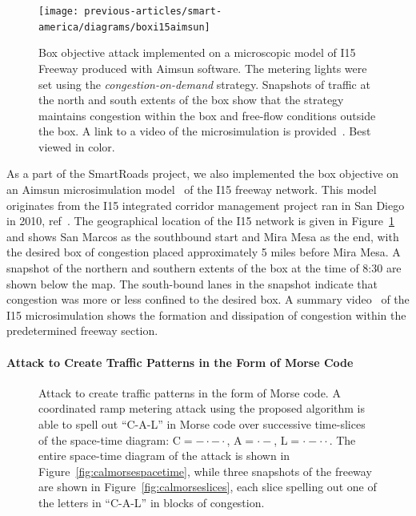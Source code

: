 \begin{figure}
	\centering
	\texttt{[image: previous-articles/smart-america/diagrams/boxi15aimsun]}
	\caption[Box objective attack implemented on a microscopic model of I15 Freeway produced with Aimsun software.]{Box objective attack implemented on a microscopic model of I15 Freeway produced with Aimsun software.  The metering lights were set using the \emph{congestion-on-demand} strategy. Snapshots of traffic at the north and south extents of the box show that the strategy maintains congestion within the box and free-flow conditions outside the box. A link to a video of the microsimulation is provided~\cite{smartroadswebsite}. Best viewed in color.}
	\label{fig:boxi15aimsun}
\end{figure}

As a part of the SmartRoads project, we also implemented the box objective on an Aimsun microsimulation model~\cite{barcelo2001microscopic} of the I15 freeway network. This model originates from the I15 integrated corridor management project ran in San Diego in 2010, ref~\cite{miller2010san}. The geographical location of the I15 network is given in Figure~\ref{fig:boxi15aimsun} and shows San Marcos as the southbound start and Mira Mesa as the end, with the desired box of congestion placed approximately 5 miles before Mira Mesa. A snapshot of the northern and southern extents of the box at the time of 8:30 are shown below the map. The south-bound lanes in the snapshot indicate that congestion was more or less confined to the desired box. A summary video~\cite{smartroadswebsite} of the I15 microsimulation shows the formation and dissipation of congestion within the predetermined freeway section.

\paragraph{Attack to Create Traffic Patterns in the Form of Morse Code}

\begin{figure}[h]%
\centering%
\hfill%
\caption[Attack to create traffic patterns in the form of Morse code. A coordinated ramp metering attack using the proposed algorithm is able to spell out ``C-A-L'' in Morse code over successive time-slices of the space-time diagram.]{Attack to create traffic patterns in the form of Morse code. A coordinated ramp metering attack using the proposed algorithm is able to spell out ``C-A-L'' in Morse code over successive time-slices of the space-time diagram: C$=- \cdot - \cdot$, A$= \cdot -$, L$= \cdot - \cdot \cdot$. The entire space-time diagram of the attack is shown in Figure~\ref{fig:calmorsespacetime}, while three snapshots of the freeway are shown in Figure~\ref{fig:calmorseslices}, each slice spelling out one of the letters in ``C-A-L'' in blocks of congestion.}
\label{fig:cal_morse}
\end{figure}

